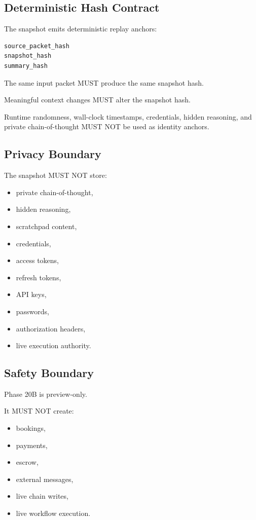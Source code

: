 \subsection{Deterministic Hash Contract}

The snapshot emits deterministic replay anchors:

\begin{verbatim}
source_packet_hash
snapshot_hash
summary_hash
\end{verbatim}

The same input packet MUST produce the same snapshot hash.

Meaningful context changes MUST alter the snapshot hash.

Runtime randomness, wall-clock timestamps, credentials, hidden reasoning, and private chain-of-thought MUST NOT be used as identity anchors.

\subsection{Privacy Boundary}

The snapshot MUST NOT store:

\begin{itemize}
  \item private chain-of-thought,
  \item hidden reasoning,
  \item scratchpad content,
  \item credentials,
  \item access tokens,
  \item refresh tokens,
  \item API keys,
  \item passwords,
  \item authorization headers,
  \item live execution authority.
\end{itemize}

\subsection{Safety Boundary}

Phase 20B is preview-only.

It MUST NOT create:

\begin{itemize}
  \item bookings,
  \item payments,
  \item escrow,
  \item external messages,
  \item live chain writes,
  \item live workflow execution.
\end{itemize}

